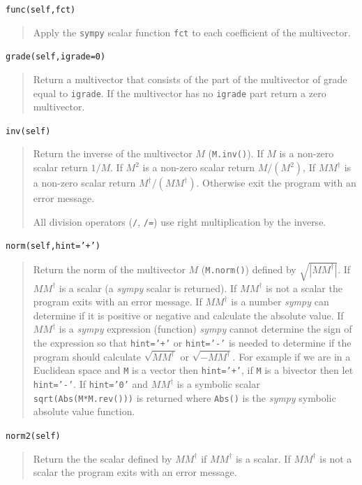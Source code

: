 \documentclass[12pt]{report}
\newcommand{\lp}{\left (}
\newcommand{\rp}{\right )}
\newcommand{\abs}[1]{\left |{#1}\right |}
\newcommand{\R}{\dagger}
\newcommand{\paren}[1]{\lp {#1} \rp}
\newcommand{\T}[1]{\texttt{#1}}
\begin{document}
\T{func(self,fct)}
\begin{quote}
   Apply the \T{sympy} scalar function \T{fct} to each coefficient of the multivector.
\end{quote}

\T{grade(self,igrade=0)}
\begin{quote}
    Return a multivector that consists of the part of the multivector of
    grade equal to \T{igrade}.  If the multivector has no \T{igrade} part
    return a zero multivector.
\end{quote}

\T{inv(self)}
\begin{quote}
   Return the inverse of the multivector $M$ (\T{M.inv()}). If $M$ is a non-zero scalar return $1/M$.  If $M^{2}$ is a non-zero
   scalar return $M/\paren{M^{2}}$, If $MM^{\R}$ is a non-zero scalar return $M^{\R}/\paren{MM^{\R}}$.  Otherwise exit the program with
   an error message.
   
   All division operators (\T{/}, \T{/=}) use right multiplication by the inverse.
\end{quote}

\T{norm(self,hint='+')}
\begin{quote}
   Return the norm of the multivector $M$ (\T{M.norm()}) defined by $\sqrt{\abs{MM^{\R}}}$.  If $MM^{\R}$ is a scalar (a \emph{sympy} scalar
   is returned).  If $MM^{\R}$ is not a scalar the program exits with an error message. If $MM^{\R}$ is a number \emph{sympy} can determine
   if it is positive or negative and calculate the absolute value.  If $MM^{\R}$ is a \emph{sympy} expression (function) \emph{sympy} cannot
   determine the sign of the expression so that \T{hint='+'} or \T{hint='-'} is needed to determine if the program should calculate
   $\sqrt{MM^{\R}}$ or $\sqrt{-MM^{\R}}$. For example if we are in a Euclidean space and \T{M} is a vector then \T{hint='+'}, if
   \T{M} is a bivector then let \T{hint='-'}. If \T{hint='0'} and $MM^{\R}$ is a symbolic scalar \T{sqrt(Abs(M*M.rev()))} is returned 
   where \T{Abs()} is the \emph{sympy} symbolic absolute value function.
\end{quote}

\T{norm2(self)}
\begin{quote}
   Return the the scalar defined by $MM^{\R}$ if $MM^{\R}$ is a scalar.  If 
   $MM^{\R}$ is not a scalar the program exits with an error message.
\end{quote}

\end{document}
